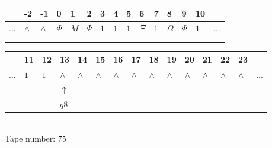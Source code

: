 \documentclass[11pt]{article}
\begin{document}
\begin{table}[H]
\centering
\begin{tabular}{lllllllllllllll}
 & -2 & -1 & 0 & 1 & 2 & 3 & 4 & 5 & 6 & 7 & 8 & 9 & 10 & \\
\hline
$...$ & \multicolumn{1}{|l|}{$\wedge$} & \multicolumn{1}{|l|}{$\wedge$} & \multicolumn{1}{|l|}{$\Phi$} & \multicolumn{1}{|l|}{$M$} & \multicolumn{1}{|l|}{$\Psi$} & \multicolumn{1}{|l|}{$1$} & \multicolumn{1}{|l|}{$1$} & \multicolumn{1}{|l|}{$1$} & \multicolumn{1}{|l|}{$\Xi$} & \multicolumn{1}{|l|}{$1$} & \multicolumn{1}{|l|}{$\Omega$} & \multicolumn{1}{|l|}{$\Phi$} & \multicolumn{1}{|l|}{$1$} & $...$\\
\hline
&  &  &  &  &  &  &  &  &  &  &  &  &  &  \\
&  &  &  &  &  &  &  &  &  &  &  &  &  &  \\
\end{tabular}
\begin{tabular}{lllllllllllllll}
 & 11 & 12 & 13 & 14 & 15 & 16 & 17 & 18 & 19 & 20 & 21 & 22 & 23 & \\
\hline
$...$ & \multicolumn{1}{|l|}{$1$} & \multicolumn{1}{|l|}{$1$} & \multicolumn{1}{|l|}{$\wedge$} & \multicolumn{1}{|l|}{$\wedge$} & \multicolumn{1}{|l|}{$\wedge$} & \multicolumn{1}{|l|}{$\wedge$} & \multicolumn{1}{|l|}{$\wedge$} & \multicolumn{1}{|l|}{$\wedge$} & \multicolumn{1}{|l|}{$\wedge$} & \multicolumn{1}{|l|}{$\wedge$} & \multicolumn{1}{|l|}{$\wedge$} & \multicolumn{1}{|l|}{$\wedge$} & \multicolumn{1}{|l|}{$\wedge$} & $...$\\
\hline
&  &  & $\uparrow$ &  &  &  &  &  &  &  &  &  &  &  \\
&  &  & $ q8 $ &  &  &  &  &  &  &  &  &  &  &  \\
\end{tabular}
\\
Tape number: 75
\noindent\makebox[\linewidth]{\hdashrule{\textwidth}{1pt}{1pt}}\end{table}
\clearpage
\end{document}
